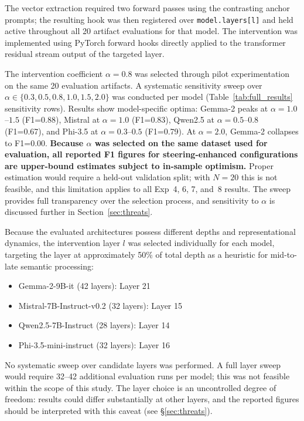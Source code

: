 \documentclass{ieeeaccess}
\begin{document}
The vector extraction required two forward passes using the contrasting anchor prompts; the resulting hook was then registered over \texttt{model.layers[l]} and held active throughout all 20 artifact evaluations for that model. The intervention was implemented using PyTorch forward hooks directly applied to the transformer residual stream output of the targeted layer.

The intervention coefficient $\alpha=0.8$ was selected through pilot experimentation on the same 20 evaluation artifacts. A systematic sensitivity sweep over $\alpha \in \{0.3, 0.5, 0.8, 1.0, 1.5, 2.0\}$ was conducted per model (Table~\ref{tab:full_results} sensitivity rows). Results show model-specific optima: Gemma-2 peaks at $\alpha=1.0$--$1.5$ (F1=0.88), Mistral at $\alpha=1.0$ (F1=0.83), Qwen2.5 at $\alpha=0.5$--$0.8$ (F1=0.67), and Phi-3.5 at $\alpha=0.3$--$0.5$ (F1=0.79). At $\alpha=2.0$, Gemma-2 collapses to F1=0.00. \textbf{Because $\alpha$ was selected on the same dataset used for evaluation, all reported F1 figures for steering-enhanced configurations are upper-bound estimates subject to in-sample optimism.} Proper estimation would require a held-out validation split; with $N=20$ this is not feasible, and this limitation applies to all Exp~4, 6, 7, and~8 results. The sweep provides full transparency over the selection process, and sensitivity to $\alpha$ is discussed further in Section~\ref{sec:threats}.

Because the evaluated architectures possess different depths and representational dynamics, the intervention layer $l$ was selected individually for each model, targeting the layer at approximately 50\% of total depth as a heuristic for mid-to-late semantic processing:

\begin{itemize}
    \item Gemma-2-9B-it (42 layers): Layer 21
    \item Mistral-7B-Instruct-v0.2 (32 layers): Layer 15
    \item Qwen2.5-7B-Instruct (28 layers): Layer 14
    \item Phi-3.5-mini-instruct (32 layers): Layer 16
\end{itemize}

No systematic sweep over candidate layers was performed. A full layer sweep would require 32--42 additional evaluation runs per model; this was not feasible within the scope of this study. The layer choice is an uncontrolled degree of freedom: results could differ substantially at other layers, and the reported figures should be interpreted with this caveat (see §\ref{sec:threats}).
\end{document}
